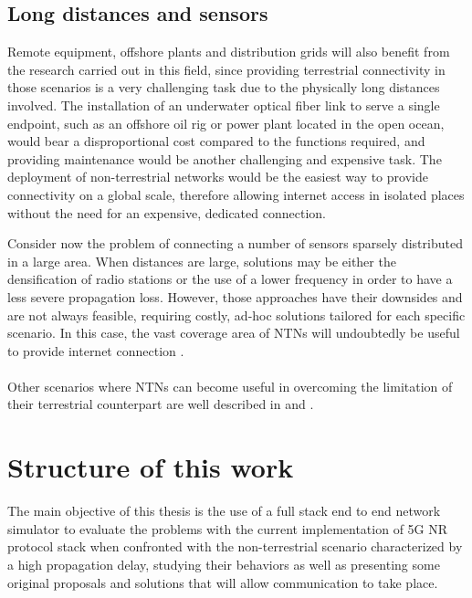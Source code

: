 \subsection{Long distances and sensors}
Remote equipment, offshore plants and distribution grids will also benefit from the research carried out in this field, since providing terrestrial connectivity in those scenarios is a very challenging task due to the physically long distances involved. The installation of an underwater optical fiber link to serve a single endpoint, such as an offshore oil rig or power plant located in the open ocean, would bear a disproportional cost compared to the functions required, and providing maintenance would be another challenging and expensive task. 
The deployment of non-terrestrial networks would be the easiest way to provide connectivity on a global scale, therefore allowing internet access in isolated places without the need for an expensive, dedicated connection.

Consider now the problem of connecting a number of sensors sparsely distributed in a large area. When distances are large, solutions may be either the densification of radio stations or the use of a lower frequency in order to have a less severe propagation loss. However, those approaches have their downsides and are not always feasible, requiring costly, ad-hoc solutions tailored for each specific scenario. In this case, the vast coverage area of \ac{NTNs} will undoubtedly be useful to provide internet connection \cite{performance-ntn-support-iot-wang}.

\paragraph{} Other scenarios where \ac{NTNs} can become useful in overcoming the limitation of their terrestrial counterpart are well described in \cite{ntn-6g-era-challenges-giordani} and \cite{potential-multilayered-nierarchical-ntn-wang}.


\section{Structure of this work}

The main objective of this thesis is the use of a full stack end to end network simulator to evaluate the problems with the current implementation of 5G \ac{NR} protocol stack when confronted with the non-terrestrial scenario characterized by a high propagation delay, studying their behaviors as well as presenting some original proposals and solutions that will allow communication to take place.

